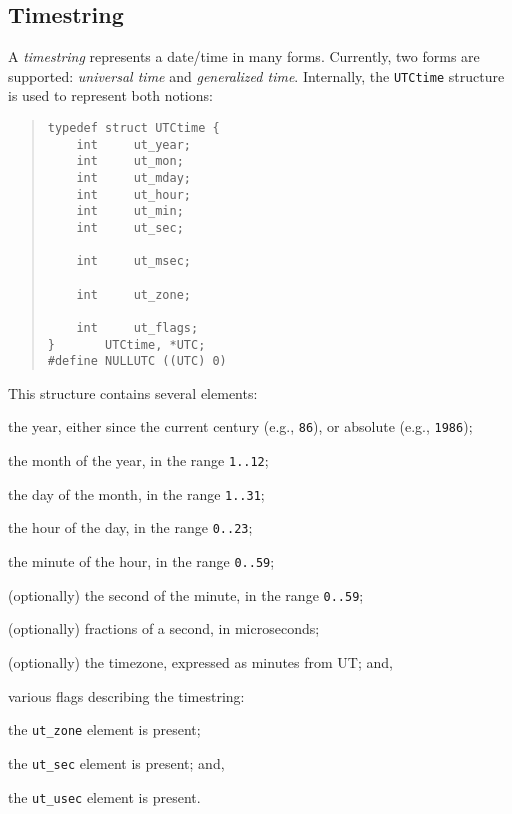 \subsection	{Timestring}
A {\em timestring\/} represents a date/time in many forms.
Currently, two forms are supported: {\em universal time\/} and
{\em generalized time}.
Internally,
the \verb"UTCtime" structure is used to represent both notions:
\begin{quote}\small\begin{verbatim}
typedef struct UTCtime {
    int     ut_year;
    int     ut_mon;
    int     ut_mday;
    int     ut_hour;
    int     ut_min;
    int     ut_sec;

    int     ut_msec;

    int     ut_zone;

    int     ut_flags;
}       UTCtime, *UTC;
#define NULLUTC ((UTC) 0)
\end{verbatim}\end{quote}
This structure contains several elements:
\begin{describe}
\item[\verb"ut\_year":] the year,
either since the current century (e.g., \verb"86"),
or absolute (e.g., \verb"1986");

\item[\verb"ut\_mon":] the month of the year, in the range \verb"1..12";

\item[\verb"ut\_mday":] the day of the month, in the range \verb"1..31";

\item[\verb"ut\_hour":] the hour of the day, in the range \verb"0..23";

\item[\verb"ut\_min":] the minute of the hour, in the range \verb"0..59";

\item[\verb"ut\_sec":] (optionally) the second of the minute,
in the range \verb"0..59";

\item[\verb"ut\_usec":] (optionally) fractions of a second, in microseconds;

\item[\verb"ut\_zone":] (optionally) the timezone, expressed as minutes from
UT; and,

\item[\verb"ut\_flags":] various flags describing the timestring:
    \begin{describe}
    \item[\verb"UT\_ZONE":] the \verb"ut_zone" element is present; 

    \item[\verb"UT\_SEC":] the \verb"ut_sec" element is present; and,

    \item[\verb"UT\_USEC":] the \verb"ut_usec" element is present.
    \end{describe}
\end{describe}

